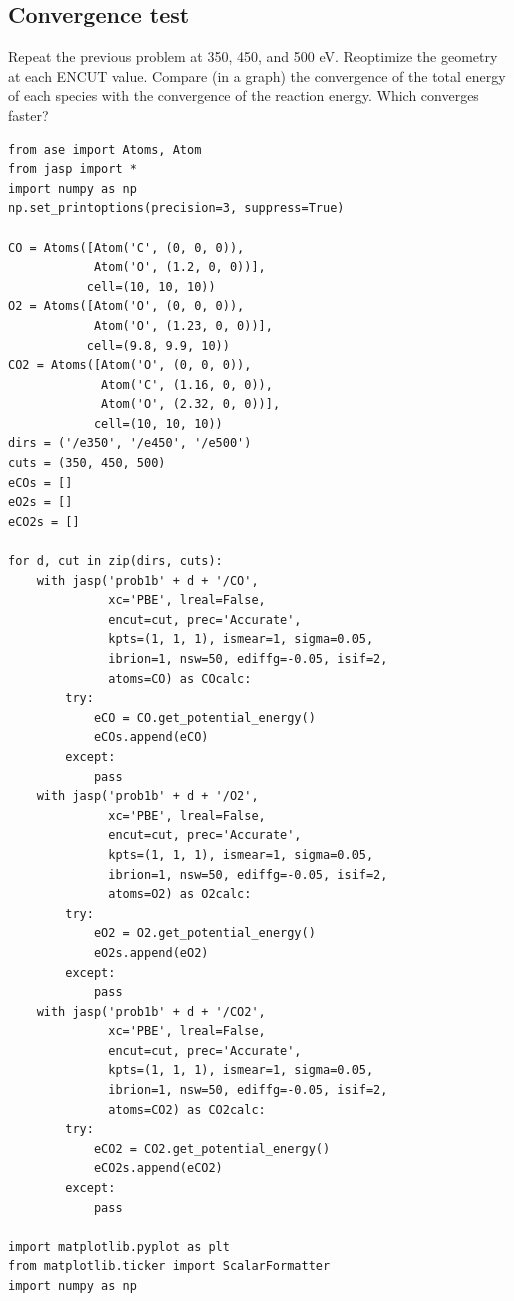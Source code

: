 \documentclass[11pt]{article}
\begin{document}
\subsection{Convergence test}
\label{sec-1-2}

Repeat the previous problem at 350, 450, and 500 eV. Reoptimize the geometry at each ENCUT value. Compare (in a graph) the convergence of the total energy of each species with the convergence of the reaction energy. Which converges faster?


\begin{verbatim}
from ase import Atoms, Atom
from jasp import *
import numpy as np
np.set_printoptions(precision=3, suppress=True)

CO = Atoms([Atom('C', (0, 0, 0)),
            Atom('O', (1.2, 0, 0))],
           cell=(10, 10, 10))
O2 = Atoms([Atom('O', (0, 0, 0)),
            Atom('O', (1.23, 0, 0))],
           cell=(9.8, 9.9, 10))
CO2 = Atoms([Atom('O', (0, 0, 0)),
             Atom('C', (1.16, 0, 0)),
             Atom('O', (2.32, 0, 0))],
            cell=(10, 10, 10))
dirs = ('/e350', '/e450', '/e500')
cuts = (350, 450, 500)
eCOs = []
eO2s = []
eCO2s = []

for d, cut in zip(dirs, cuts):
    with jasp('prob1b' + d + '/CO',
              xc='PBE', lreal=False,
              encut=cut, prec='Accurate',
              kpts=(1, 1, 1), ismear=1, sigma=0.05,
              ibrion=1, nsw=50, ediffg=-0.05, isif=2,
              atoms=CO) as COcalc:
        try:
            eCO = CO.get_potential_energy()
            eCOs.append(eCO)
        except:
            pass
    with jasp('prob1b' + d + '/O2',
              xc='PBE', lreal=False,
              encut=cut, prec='Accurate',
              kpts=(1, 1, 1), ismear=1, sigma=0.05,
              ibrion=1, nsw=50, ediffg=-0.05, isif=2,
              atoms=O2) as O2calc:
        try:
            eO2 = O2.get_potential_energy()
            eO2s.append(eO2)
        except:
            pass
    with jasp('prob1b' + d + '/CO2',
              xc='PBE', lreal=False,
              encut=cut, prec='Accurate',
              kpts=(1, 1, 1), ismear=1, sigma=0.05,
              ibrion=1, nsw=50, ediffg=-0.05, isif=2,
              atoms=CO2) as CO2calc:
        try:
            eCO2 = CO2.get_potential_energy()
            eCO2s.append(eCO2)
        except:
            pass

import matplotlib.pyplot as plt
from matplotlib.ticker import ScalarFormatter
import numpy as np


\end{verbatim}
\end{document}
